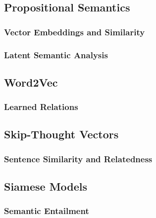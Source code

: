		\subsection{Propositional Semantics} %

			\subsubsection{Vector Embeddings and Similarity} %

			\subsubsection{Latent Semantic Analysis} %

		\subsection{Word2Vec} %

			\subsubsection{Learned Relations} %

		\subsection{Skip-Thought Vectors} %

			\subsubsection{Sentence Similarity and Relatedness} %

		\subsection{Siamese Models} %

			\subsubsection{Semantic Entailment} %

